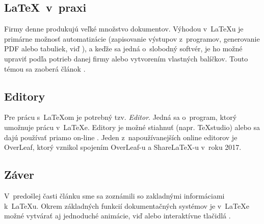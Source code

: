 \documentclass[a4paper, 11pt]{article}
\begin{document}
\subsection{\LaTeX\, v~praxi}	
Firmy denne produkujú veľké množstvo dokumentov. Výhodou v~\LaTeX u je primárne možnosť automatizácie (zapisovanie výstupov z~programov, generovanie PDF alebo tabuliek, viď \cite{latexTables}), a keďže sa jedná o~slobodný softvér, je ho možné upraviť podľa potrieb danej firmy alebo vytvorením vlastných balíčkov. Touto témou sa zaoberá článok \cite{practicalLatex}.

\subsection{Editory}
Pre prácu s~\LaTeX om je potrebný tzv. \emph{Editor}. Jedná sa o~program, ktorý umožnuje prácu v~\LaTeX e.
Editory je možné stiahnuť (napr. TeXstudio) alebo sa dajú používať priamo on-line \cite{onlineLatex}. Jeden z~napoužívanejších online editorov je OverLeaf, ktorý vznikol spojením OverLeaf-u a ShareLaTeX-u v~roku 2017.

\subsection{Záver}
V~predošlej časti článku sme sa zoznámili so zakladnými informáciami k~\LaTeX u. Okrem základných funkcií dokumentačných systémov je v~\LaTeX e možné vytvárať aj jednoduché animácie, viď \cite{animations} alebo interaktívne tlačidlá \cite{buttons}.

\newpage

\renewcommand{\refname}{Literatúra}

\end{document}
